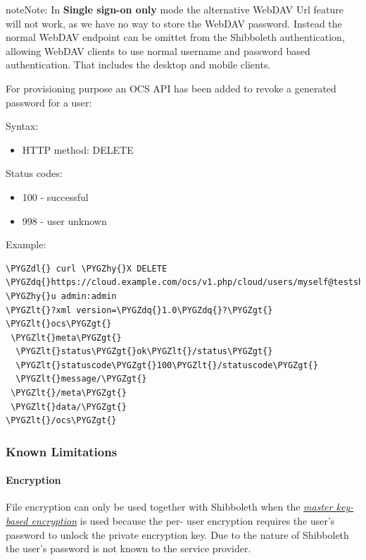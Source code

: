 \documentclass[letterpaper,10pt,english]{sphinxmanual}
\def\PYGZus{\char`\_}
\def\PYGZlt{\char`\<}
\def\PYGZgt{\char`\>}
\def\PYGZdl{\char`\$}
\def\PYGZhy{\char`\-}
\def\PYGZdq{\char`\"}
\begin{document}
\begin{notice}{note}{Note:}
In \textbf{Single sign-on only} mode the alternative WebDAV Url feature
will not work, as we have no way to store the WebDAV password. Instead the
normal WebDAV endpoint can be omittet from the Shibboleth authentication,
allowing WebDAV clients to use normal username and password based
authentication. That includes the desktop and mobile clients.
\end{notice}

For provisioning purpose an OCS API has been added to revoke a generated
password for a user:

Syntax: 
\begin{itemize}
\item {} 
HTTP method: DELETE

\end{itemize}

Status codes:
\begin{itemize}
\item {} 
100 - successful

\item {} 
998 - user unknown

\end{itemize}

Example:

\begin{Verbatim}[commandchars=\\\{\}]
\PYGZdl{} curl \PYGZhy{}X DELETE \PYGZdq{}https://cloud.example.com/ocs/v1.php/cloud/users/myself@testshib.org/non\PYGZus{}shib\PYGZus{}password\PYGZdq{} \PYGZhy{}u admin:admin
\PYGZlt{}?xml version=\PYGZdq{}1.0\PYGZdq{}?\PYGZgt{}
\PYGZlt{}ocs\PYGZgt{}
 \PYGZlt{}meta\PYGZgt{}
  \PYGZlt{}status\PYGZgt{}ok\PYGZlt{}/status\PYGZgt{}
  \PYGZlt{}statuscode\PYGZgt{}100\PYGZlt{}/statuscode\PYGZgt{}
  \PYGZlt{}message/\PYGZgt{}
 \PYGZlt{}/meta\PYGZgt{}
 \PYGZlt{}data/\PYGZgt{}
\PYGZlt{}/ocs\PYGZgt{}
\end{Verbatim}


\subsubsection{Known Limitations}
\label{enterprise_user_management/user_auth_shibboleth:known-limitations}

\paragraph{Encryption}
\label{enterprise_user_management/user_auth_shibboleth:encryption}
File encryption can only be used together with Shibboleth when the
{\hyperref[configuration_files/encryption_configuration:occ-encryption-label]{\emph{master key-based encryption}}} is used because the
per- user encryption requires the user's password to unlock the private
encryption key. Due to the nature of Shibboleth the user's password is not known
to the service provider.
\end{document}
